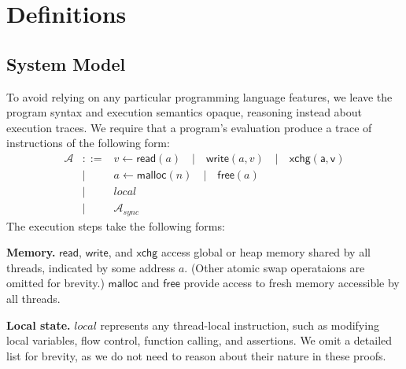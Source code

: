 \section{Definitions}

\subsection{System Model}

To avoid relying on any particular programming language features,
we leave the program syntax and execution semantics opaque,
reasoning instead about execution traces.
We require that a program's evaluation produce a trace of instructions of the following form:
\begin{eqnarray*}
	\mathcal{A} &::=& v \leftarrow \mathsf{read}(a) \quad | \quad \mathsf{write}(a,v) \quad | \quad \mathsf{xchg(a,v)} \\
		&|& a \leftarrow \mathsf{malloc}(n) \quad | \quad \mathsf{free}(a) \\
		&|& \textit{local} \\
		&|& \mathcal{A}_{sync}
\end{eqnarray*}
The execution steps take the following forms:

{\bf Memory.}
$\mathsf{read}$, $\mathsf{write}$, and $\mathsf{xchg}$ access global or heap memory shared by all threads, indicated by some address $a$.
(Other atomic swap operataions are omitted for brevity.)
$\mathsf{malloc}$ and $\mathsf{free}$ provide access to fresh memory accessible by all threads. %

{\bf Local state.}
$\textit{local}$ represents any thread-local instruction, such as modifying local variables, flow control, function calling, and assertions. %
We omit a detailed list for brevity, as we do not need to reason about their nature in these proofs.


